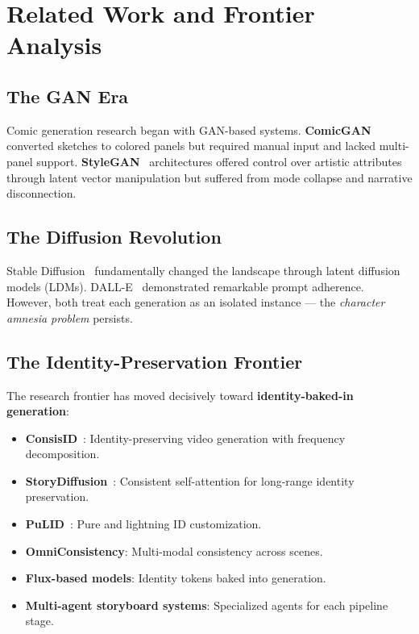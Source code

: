 \documentclass[11pt,a4paper,twocolumn]{article}
\begin{document}
\section{Related Work and Frontier Analysis}
\label{sec:related}

\subsection{The GAN Era}

Comic generation research began with GAN-based systems. \textbf{ComicGAN}~\cite{comicgan2021} converted sketches to colored panels but required manual input and lacked multi-panel support. \textbf{StyleGAN}~\cite{karras2019} architectures offered control over artistic attributes through latent vector manipulation but suffered from mode collapse and narrative disconnection.

\subsection{The Diffusion Revolution}

Stable Diffusion~\cite{rombach2022} fundamentally changed the landscape through latent diffusion models (LDMs). DALL-E~\cite{ramesh2021} demonstrated remarkable prompt adherence. However, both treat each generation as an isolated instance --- the \textit{character amnesia problem} persists.

\subsection{The Identity-Preservation Frontier}

The research frontier has moved decisively toward \textbf{identity-baked-in generation}:

\begin{itemize}[leftmargin=*, nosep]
    \item \textbf{ConsisID}~\cite{consisid2024}: Identity-preserving video generation with frequency decomposition.
    \item \textbf{StoryDiffusion}~\cite{storydiffusion2024}: Consistent self-attention for long-range identity preservation.
    \item \textbf{PuLID}~\cite{pulid2024}: Pure and lightning ID customization.
    \item \textbf{OmniConsistency}: Multi-modal consistency across scenes.
    \item \textbf{Flux-based models}: Identity tokens baked into generation.
    \item \textbf{Multi-agent storyboard systems}: Specialized agents for each pipeline stage.
\end{itemize}
\end{document}
